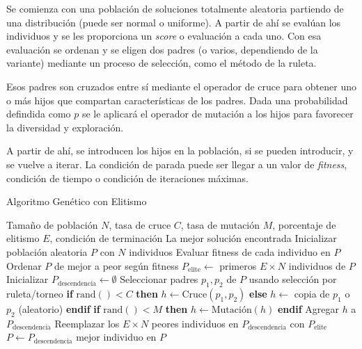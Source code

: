 \documentclass[12pt,letterpaper]{article}
\begin{document}
Se comienza con una población de soluciones totalmente aleatoria partiendo de una distribución (puede ser normal o uniforme). A partir de ahí se evalúan los individuos y se les proporciona un \textit{score} o evaluación a cada uno. Con esa evaluación se ordenan y se eligen dos padres (o varios, dependiendo de la variante) mediante un proceso de selección, como el método de la ruleta.

Esos padres son cruzados entre sí mediante el operador de cruce para obtener uno o más hijos que compartan características de los padres. Dada una probabilidad defindida como $p$ se le aplicará el operador de mutación a los hijos para favorecer la diversidad y exploración.

A partir de ahí, se introducen los hijos en la población, si se pueden introducir, y se vuelve a iterar. La condición de parada puede ser llegar a un valor de \textit{fitness}, condición de tiempo o condición de iteraciones máximas.

\begin{algorithm}
\caption{Algoritmo Genético con Elitismo}
\begin{algorithmic}[1]
\Require Tamaño de población \( N \), tasa de cruce \( C \), tasa de mutación \( M \), porcentaje de elitismo \( E \), condición de terminación
\Ensure La mejor solución encontrada
\State Inicializar población aleatoria \( P \) con \( N \) individuos
    \State Evaluar fitness de cada individuo en \( P \)
    \State Ordenar \( P \) de mejor a peor según fitness
    \State \( P_{\text{elite}} \gets \) primeros \( E \times N \) individuos de \( P \)
    \State Inicializar \( P_{\text{descendencia}} \gets \emptyset \)
        \State Seleccionar padres \( p_1, p_2 \) de \( P \) usando selección por ruleta/torneo
        \State \textbf{if} \( \text{rand}() < C \) \textbf{then}
            \State \( h \gets \text{Cruce}(p_1, p_2) \)
        \State \textbf{else}
            \State \( h \gets \) copia de \( p_1 \) o \( p_2 \) (aleatorio)
        \State \textbf{endif}
        \State \textbf{if} \( \text{rand}() < M \) \textbf{then}
            \State \( h \gets \text{Mutación}(h) \)
        \State \textbf{endif}
        \State Agregar \( h \) a \( P_{\text{descendencia}} \)
    \EndFor
    \State Reemplazar los \( E \times N \) peores individuos en \( P_{\text{descendencia}} \) con \( P_{\text{elite}} \)
    \State \( P \gets P_{\text{descendencia}} \)
\EndWhile
\State \Return mejor individuo en \( P \)
\end{algorithmic}
\end{algorithm}
\end{document}
